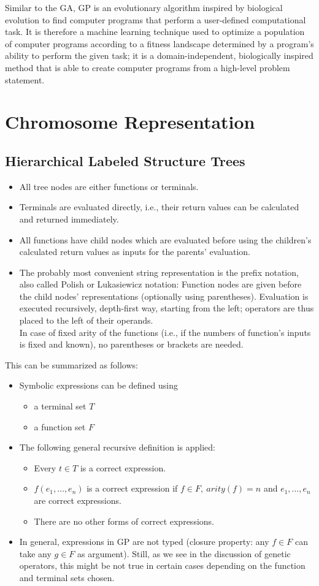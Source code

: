 \documentclass[12pt]{book}
\newcounter{subsubsubsection}[subsubsection]
\begin{document}
Similar to the GA, GP is an evolutionary algorithm inspired by biological evolution to find computer programs that perform a user-defined computational task. It is therefore a machine learning technique used to optimize a population of computer programs according to a fitness landscape determined by a program's ability to perform the given task; it is a domain-independent, biologically inspired method that is able to create computer programs from a high-level problem statement.
\section{Chromosome Representation}
\subsection{Hierarchical Labeled Structure Trees}
\begin{itemize}
\item All tree nodes are either functions or terminals.
\item Terminals are evaluated directly, i.e., their return values can be calculated and returned immediately.
\item All functions have child nodes which are evaluated before using the children's calculated return values as inputs for the parents' evaluation.
\item The probably most convenient string representation is the prefix notation, also called Polish or Lukasiewicz notation: Function nodes are given before the child nodes' representations (optionally using parentheses). Evaluation is executed recursively, depth-first way, starting from the left; operators are thus placed to the left of their operands.\\
In case of fixed arity of the functions (i.e., if the numbers of function's inputs is fixed and known), no parentheses or brackets are needed.
\end{itemize}
This can be summarized as follows:
\begin{itemize}
\item Symbolic expressions can be defined using
\begin{itemize}
\item a terminal set $T$
\item a function set $F$
\end{itemize}
\item The following general recursive definition is applied:
\begin{itemize}
\item Every $t \in T$ is a correct expression.
\item $f(e_1,\dots,e_n)$ is a correct expression if $f \in F,\ arity(f) = n$ and $e_1,\dots,e_n$ are correct expressions.
\item There are no other forms of correct expressions.
\end{itemize}
\item In general, expressions in GP are not typed (closure property: any $f \in F$ can take any $g \in F$ as argument). Still, as we see in the discussion of genetic operators, this might be not true in certain cases depending on the function and terminal sets chosen.
\end{itemize}
\end{document}
